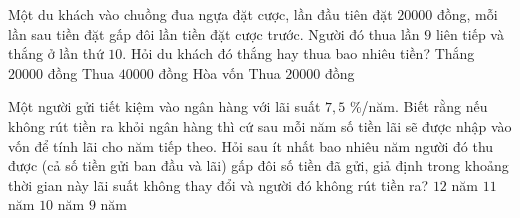 \begin{ex}%
	Một du khách vào chuồng đua ngựa đặt cược, lần đầu tiên đặt $20000$ đồng, mỗi lần sau tiền đặt gấp đôi lần tiền đặt cược trước. Người đó thua lần $9$ liên tiếp và thắng ở lần thứ $10$. Hỏi du khách đó thắng hay thua bao nhiêu tiền?
	\choice
	{\True Thắng $20000$ đồng}
	{Thua $40000$ đồng}
	{Hòa vốn}
	{Thua $20000$ đồng}
\end{ex}

\begin{ex}%
	Một người gửi tiết kiệm vào ngân hàng với lãi suất $7{,}5$ \%/năm. Biết rằng nếu không rút tiền ra khỏi ngân hàng thì cứ sau mỗi năm số tiền lãi sẽ được nhập vào vốn để tính lãi cho năm tiếp theo. Hỏi sau ít nhất bao nhiêu năm người đó thu được (cả số tiền gửi ban đầu và lãi) gấp đôi số tiền đã gửi, giả định trong khoảng thời gian này lãi suất không thay đổi và người đó không rút tiền ra?
	\choice
	{$12$ năm}
	{$11$ năm}
	{\True $10$ năm}
	{$9$ năm}
\end{ex}

